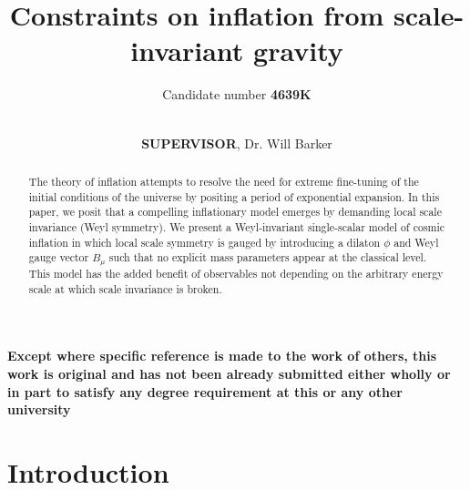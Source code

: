 \documentclass[aps,prd,reprint,preprintnumbers,showpacs,floatfix,nofootinbib,superscript address]{revtex4-2}
\newcommand{\wb}[1]{{\color[RGB]{255,0,0}{\textbf{\textit{[WB: #1]}}}}}
\newcommand{\pcs}[1]{{\color[RGB]{0,100,0}{\textbf{\textit{[PCS: #1]}}}}}
\begin{document}
\title{Constraints on inflation from scale-invariant gravity}

\author{Candidate number \textbf{4639K}}
\author{\\\textbf{SUPERVISOR}, Dr. Will Barker}

\begin{widetext}
    \textbf{Except where specific reference is made to the work of others, this work is original and has not been already submitted either wholly or in part to satisfy any degree requirement at this or any other university}
\end{widetext}
\begin{abstract}
The theory of inflation attempts to resolve the need for extreme fine-tuning of the initial conditions of the universe by positing a period of exponential expansion. In this paper, we posit that a compelling inflationary model emerges by demanding local scale invariance (Weyl symmetry). We present a Weyl‐invariant single‐scalar model of cosmic inflation in which local scale symmetry is gauged by introducing a dilaton $\phi$ and Weyl gauge vector $B_\mu$ such that no explicit mass parameters appear at the classical level. This model has the added benefit of observables not depending on the arbitrary energy scale at which scale invariance is broken. 
\end{abstract}


\maketitle
\tableofcontents

\section{Introduction} \label{Introduction}

\end{document}
